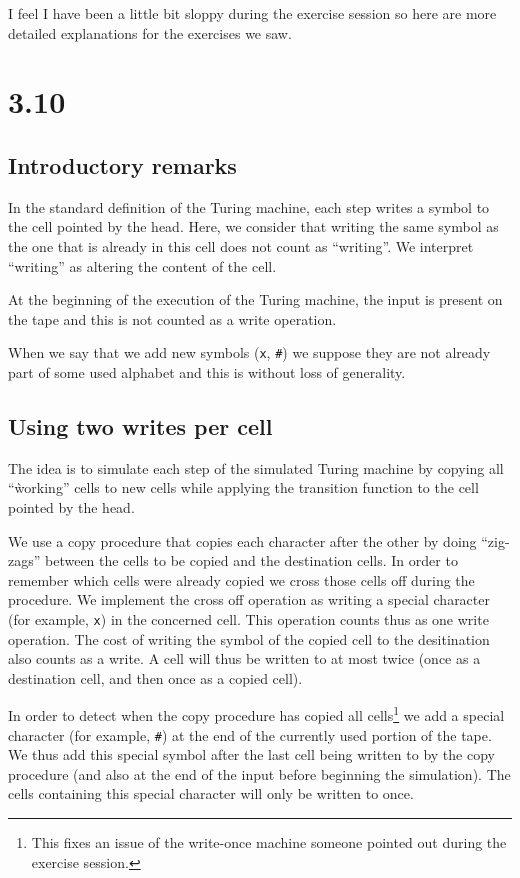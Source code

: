\documentclass{article}
\begin{document}
I feel I have been a little bit sloppy during the exercise session so here are
more detailed explanations for the exercises we saw.

\section*{3.10}

\subsection*{Introductory remarks}
In the standard definition of the Turing machine, each step writes a symbol to
the cell pointed by the head. Here, we consider that writing the same symbol as
the one that is already in this cell does not count as ``writing''. We
interpret ``writing'' as altering the content of the cell.

At the beginning of the execution of the Turing machine, the input is
present on the tape and this is not counted as a write operation.

When we say that we add new symbols (\texttt{x}, \texttt{\#}) we suppose they
are not already part of some used alphabet and this is without loss of generality.

\subsection*{Using two writes per cell}
The idea is to simulate each step of the simulated
Turing machine by copying all ``ẁorking'' cells to new cells
while applying the transition function to the cell pointed by the head.

We use a copy procedure that copies each character after
the other by doing ``zig-zags'' between the cells to be copied and the destination
cells. In order to remember which cells were already copied we cross those
cells off during the procedure. We implement the cross off operation as
writing a special character (for example, \texttt{x}) in the concerned cell.
This operation counts thus as one write operation. The cost of writing the
symbol of the copied cell to the desitination also counts as a write. A cell
will thus be written to at most twice (once as a destination cell, and then
once as a copied cell).

In order to detect when the copy procedure has copied all cells\footnote{%
This fixes an issue of the write-once machine someone pointed out during the
exercise session.}
we add a
special character (for example, \texttt{\#})
at the end of the currently used portion of the tape.
We thus add this special symbol after the last cell being written to by the
copy procedure (and also at the end of the input before beginning the
simulation). The cells containing this special character will only be written to once.
\end{document}
